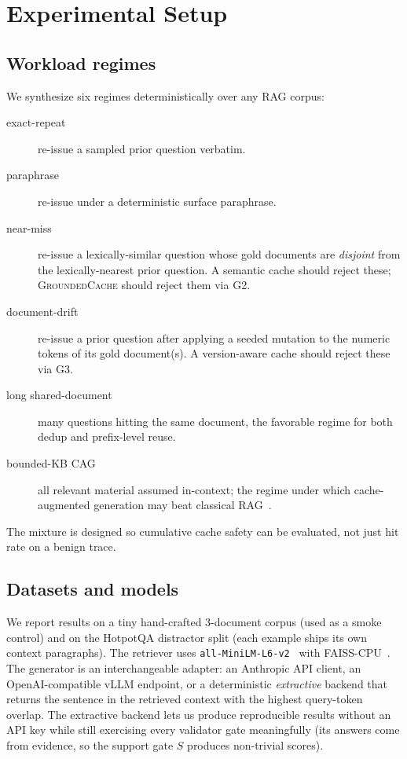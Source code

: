 \documentclass[11pt]{article}
\newcommand{\sys}{\textsc{GroundedCache}\xspace}
\begin{document}
\section{Experimental Setup}
\subsection{Workload regimes}
We synthesize six regimes deterministically over any RAG corpus:
\begin{description}
  \item[exact-repeat] re-issue a sampled prior question verbatim.
  \item[paraphrase] re-issue under a deterministic surface paraphrase.
  \item[near-miss] re-issue a lexically-similar question whose gold
        documents are \emph{disjoint} from the lexically-nearest prior
        question. A semantic cache should reject these; \sys{} should
        reject them via G2.
  \item[document-drift] re-issue a prior question after applying a
        seeded mutation to the numeric tokens of its gold document(s).
        A version-aware cache should reject these via G3.
  \item[long shared-document] many questions hitting the same document,
        the favorable regime for both dedup and prefix-level reuse.
  \item[bounded-KB CAG] all relevant material assumed in-context; the
        regime under which cache-augmented generation may beat classical
        RAG~\citep{cag-bounded}.
\end{description}
The mixture is designed so cumulative cache safety can be evaluated, not
just hit rate on a benign trace.

\subsection{Datasets and models}
We report results on a tiny hand-crafted 3-document corpus (used as a smoke
control) and on the HotpotQA distractor split (each example ships its own
context paragraphs). The retriever uses
\texttt{all-MiniLM-L6-v2}~\citep{minilm} with FAISS-CPU~\citep{johnson2017faiss}.
The generator is an interchangeable adapter: an Anthropic API client,
an OpenAI-compatible vLLM endpoint, or a deterministic \emph{extractive}
backend that returns the sentence in the retrieved context with the
highest query-token overlap. The extractive backend lets us produce
reproducible results without an API key while still exercising every
validator gate meaningfully (its answers come from evidence, so the
support gate $S$ produces non-trivial scores).
\end{document}
